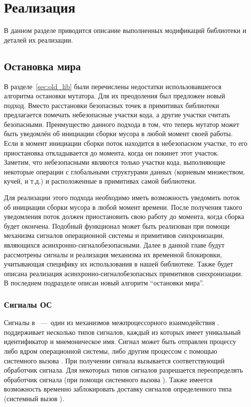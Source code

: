 \section{Реализация}

В данном разделе приводится описание выполненных модификаций библиотеки
и деталей их реализации.


\subsection{Остановка мира}
\label{sec:stw}
В разделе~\ref{sec:old_lib} были перечислены недостатки использовавшегося алгоритма 
остановки мутатора. 
Для их преодоления был предложен новый подход. 
Вместо расстановки безопасных точек в примитивах библиотеки предлагается помечать 
небезопасные участки кода, а другие участки считать безопасными. 
Преимущество данного подхода в том, что теперь мутатор может быть уведомлён 
об инициации сборки мусора в любой момент своей работы. 
Если в момент инициации сборки поток находится в небезопасном участке, то его приостановка 
откладывается до момента, когда он покинет этот участок. 
Заметим, что небезопасными являются только участки кода, выполняющие некоторые операции с 
глобальными структурами данных (корневым множеством, кучей, и т.д.) и расположенные в 
примитивах самой библиотеки.

Для реализации этого подхода необходимо иметь возможность уведомить поток об инициации 
сборки мусора в любой момент времени. 
После получения такого уведомления поток должен приостановить свою работу до момента, 
когда сборка будет окончена. 
Подобный функционал может быть реализован при помощи механизма сигналов операционной системы 
 и примитивов синхронизации, являющихся 
асинхронно-сигналобезопасными. 
Далее в данной главе будут рассмотрены сигналы и реализация механизма их временной блокировки, 
учитывающая специфику их использования в нашей библиотеке. 
Также будет описана реализация асинхронно-сигналобезопасных примитивов синхронизации. 
В последнем подразделе описан новый алгоритм ``остановки мира''. 


\subsubsection{Сигналы ОС }
Сигналы в ~---~один из механизмов межпроцессорного взаимодействия \cite{book:os_linux}. 
 поддерживает несколько типов сигналов, каждый из которых имеет уникальный идентификатор 
и мнемоническое имя. 
Сигнал может быть отправлен процессу либо ядром операционной системы, либо другим процессом 
с помощью системного вызова . 
При получении сигнала вызывается соответствующий обработчик сигнала. 
Для некоторых типов сигналов разрешается переопределять обработчик сигнала (при помощи 
системного вызова ). 
Также имеется возможность временно заблокировать доставку сигналов определенного типа 
(системный вызов ).

